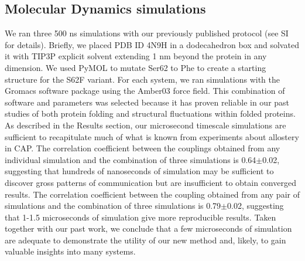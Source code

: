 \documentclass[../main.tex]{subfiles}
\begin{document}
    \subsection{Molecular Dynamics simulations}
        We ran three 500 ns simulations with our previously published protocol\cite{Hart:2016kb} (see SI for details). Briefly, we placed PDB ID 4N9H\cite{Seok:2014cs} in a dodecahedron box and solvated it with TIP3P explicit solvent\cite{Jorgensen:1983fl} extending 1 nm beyond the protein in any dimension. We used PyMOL\cite{DeLano:2010wf} to mutate Ser62 to Phe to create a starting structure for the S62F variant.  For each system, we ran simulations with the Gromacs software package\cite{VanDerSpoel:2005hz} using the Amber03 force field\cite{Duan:2003gt}. This combination of software and parameters was selected because it has proven reliable in our past studies of both protein folding\cite{Bowman:2011bc} and structural fluctuations within folded proteins\cite{Hart:2016kb,Bowman:2015dh,Bowman:2015da}.
        As described in the Results section, our microsecond timescale simulations are sufficient to recapitulate much of what is known from experiments about allostery in CAP. The correlation coefficient between the couplings obtained from any individual simulation and the combination of three simulations is 0.64$\pm$0.02, suggesting that hundreds of nanoseconds of simulation may be sufficient to discover gross patterns of communication but are insufficient to obtain converged results.  The correlation coefficient between the coupling obtained from any pair of simulations and the combination of three simulations is 0.79$\pm$0.02, suggesting that 1-1.5 microseconds of simulation give more reproducible results. Taken together with our past work, we conclude that a few microseconds of simulation are adequate to demonstrate the utility of our new method and, likely, to gain valuable insights into many systems.
\end{document}
